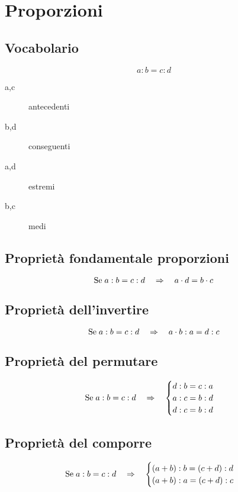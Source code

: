\chapter{Proporzioni}
\section{Vocabolario}
\[a:b=c:d\]
\begin{description}
	\item[a,c] antecedenti
	\item[b,d] conseguenti
	\item[a,d] estremi
	\item[b,c] medi
\end{description}
\section{Proprietà fondamentale proporzioni}
\begin{equation}                       
	\text{Se\;}a:b=c:d\quad\Rightarrow\quad a\cdot d=b\cdot c
\end{equation}
\section{Proprietà dell'invertire}
\begin{equation}                       
\text{Se\;}a:b=c:d\quad\Rightarrow\quad a\cdot b:a=d:c
\end{equation}
\section{Proprietà del permutare}
\begin{equation}                       
\text{Se\;}a:b=c:d\quad\Rightarrow\quad \begin{cases}
d:b=c:a\\
a:c=b:d\\
d:c=b:d
\end{cases}
\end{equation}
\section{Proprietà del comporre}
\begin{equation}                       
\text{Se\;}a:b=c:d\quad\Rightarrow\quad \begin{cases}
(a+b):b=(c+d):d\\
(a+b):a=(c+d):c
\end{cases}
\end{equation}
